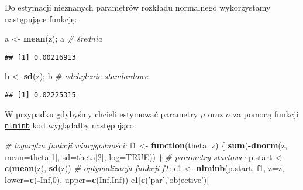 \documentclass[polish,]{book}
\newenvironment{Shaded}{\begin{snugshade}}{\end{snugshade}}
\newcommand{\CommentTok}[1]{\textcolor[rgb]{0.56,0.35,0.01}{\textit{#1}}}
\newcommand{\ControlFlowTok}[1]{\textcolor[rgb]{0.13,0.29,0.53}{\textbf{#1}}}
\newcommand{\DataTypeTok}[1]{\textcolor[rgb]{0.13,0.29,0.53}{#1}}
\newcommand{\DecValTok}[1]{\textcolor[rgb]{0.00,0.00,0.81}{#1}}
\newcommand{\KeywordTok}[1]{\textcolor[rgb]{0.13,0.29,0.53}{\textbf{#1}}}
\newcommand{\NormalTok}[1]{#1}
\newcommand{\OperatorTok}[1]{\textcolor[rgb]{0.81,0.36,0.00}{\textbf{#1}}}
\newcommand{\OtherTok}[1]{\textcolor[rgb]{0.56,0.35,0.01}{#1}}
\newcommand{\StringTok}[1]{\textcolor[rgb]{0.31,0.60,0.02}{#1}}
\begin{document}
Do estymacji nieznanych parametrów rozkładu normalnego wykorzystamy następujące funkcję:

\begin{Shaded}
\begin{Highlighting}[]
\NormalTok{a <-}\StringTok{ }\KeywordTok{mean}\NormalTok{(z); a }\CommentTok{# średnia}
\end{Highlighting}
\end{Shaded}

\begin{verbatim}
## [1] 0.00216913
\end{verbatim}

\begin{Shaded}
\begin{Highlighting}[]
\NormalTok{b <-}\StringTok{ }\KeywordTok{sd}\NormalTok{(z); b   }\CommentTok{# odchylenie standardowe}
\end{Highlighting}
\end{Shaded}

\begin{verbatim}
## [1] 0.02225315
\end{verbatim}

W przypadku gdybyśmy chcieli estymować parametry \(\mu\) oraz \(\sigma\) za pomocą funkcji \href{https://rdrr.io/r/stats/nlminb.html}{\texttt{nlminb}} kod wyglądałby następująco:

\begin{Shaded}
\begin{Highlighting}[]
\CommentTok{# logarytm funkcji wiarygodności:}
\NormalTok{f1 <-}\StringTok{ }\ControlFlowTok{function}\NormalTok{(theta, z) \{}
  \KeywordTok{sum}\NormalTok{(}\OperatorTok{-}\KeywordTok{dnorm}\NormalTok{(z, }\DataTypeTok{mean=}\NormalTok{theta[}\DecValTok{1}\NormalTok{], }\DataTypeTok{sd=}\NormalTok{theta[}\DecValTok{2}\NormalTok{], }\DataTypeTok{log=}\OtherTok{TRUE}\NormalTok{))}
\NormalTok{  \}}
\CommentTok{# parametry startowe:}
\NormalTok{p.start <-}\StringTok{ }\KeywordTok{c}\NormalTok{(}\KeywordTok{mean}\NormalTok{(z), }\KeywordTok{sd}\NormalTok{(z))}
\CommentTok{# optymalizacja funkcji f1:}
\NormalTok{e1 <-}\StringTok{ }\KeywordTok{nlminb}\NormalTok{(p.start, f1, }\DataTypeTok{z=}\NormalTok{z, }\DataTypeTok{lower=}\KeywordTok{c}\NormalTok{(}\OperatorTok{-}\OtherTok{Inf}\NormalTok{,}\DecValTok{0}\NormalTok{), }\DataTypeTok{upper=}\KeywordTok{c}\NormalTok{(}\OtherTok{Inf}\NormalTok{,}\OtherTok{Inf}\NormalTok{))}
\NormalTok{e1[}\KeywordTok{c}\NormalTok{(}\StringTok{'par'}\NormalTok{,}\StringTok{'objective'}\NormalTok{)]}
\end{Highlighting}
\end{Shaded}
\end{document}
